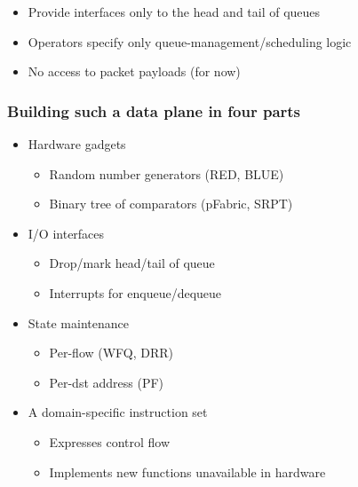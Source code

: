 \begin{Large}
\begin{frame}[plain]
\begin{itemize}
\item Provide interfaces only to the head and tail of queues
\item Operators specify only queue-management/scheduling logic
\item No access to packet payloads (for now)
\end{itemize}
\end{frame}

\begin{frame}[plain]
\frametitle{Building such a data plane in four parts}
\begin{itemize}
\item Hardware gadgets
      \begin{itemize}
      \item Random number generators (RED, BLUE)
      \item Binary tree of comparators (pFabric, SRPT)
      \end{itemize}

\item I/O interfaces
      \begin{itemize}
      \item Drop/mark head/tail of queue
      \item Interrupts for enqueue/dequeue
      \end{itemize}

\item State maintenance
      \begin{itemize}
      \item Per-flow (WFQ, DRR)
      \item Per-dst address (PF)
      \end{itemize}

\item A domain-specific instruction set
      \begin{itemize}
      \item Expresses control flow
      \item Implements new functions unavailable in hardware
      \end{itemize}
\end{itemize}
\end{frame}


\end{Large}
